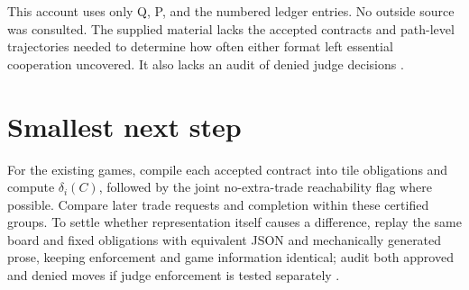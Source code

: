\documentclass{article}
\begin{document}
This account uses only Q, P, and the numbered ledger entries. No outside source was consulted. The supplied material lacks the accepted contracts and path-level trajectories needed to determine how often either format left essential cooperation uncovered. It also lacks an audit of denied judge decisions .

\section*{Smallest next step}

For the existing games, compile each accepted contract into tile obligations and compute \(\delta_i(C)\), followed by the joint no-extra-trade reachability flag where possible. Compare later trade requests and completion within these certified groups. To settle whether representation itself causes a difference, replay the same board and fixed obligations with equivalent JSON and mechanically generated prose, keeping enforcement and game information identical; audit both approved and denied moves if judge enforcement is tested separately .
\end{document}
